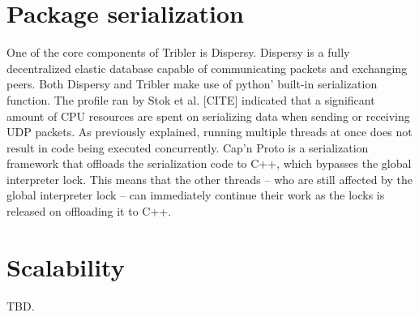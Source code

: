 \section{Package serialization}
One of the core components of Tribler is Dispersy. Dispersy is a fully decentralized elastic database capable of communicating packets and exchanging peers.
Both Dispersy and Tribler make use of python' built-in serialization function.
The profile ran by Stok et al. [CITE] indicated that a significant amount of CPU resources are spent on serializing data when sending or receiving UDP packets.
As previously explained, running multiple threads at once does not result in code being executed concurrently.
Cap'n Proto is a serialization framework that offloads the serialization code to C++, which bypasses the global interpreter lock.
This means that the other threads -- who are still affected by the global interpreter lock -- can immediately continue their work as the locks is released on offloading it to C++.

\section{Scalability}
TBD.